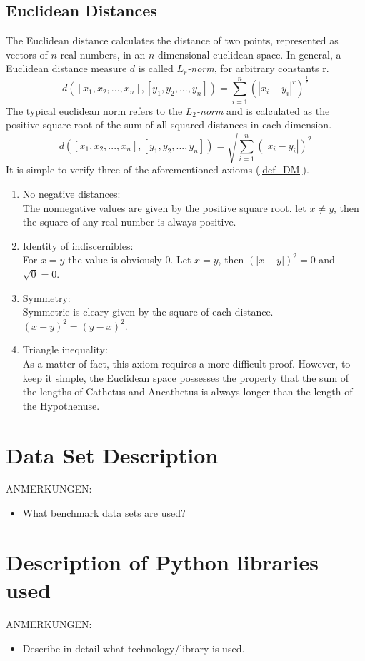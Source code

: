 \documentclass[12pt]%
{article}
\begin{document}
\subsection{Euclidean Distances}
The Euclidean distance calculates the distance of two points, represented as vectors of $n$ real numbers, in an $n$-dimensional euclidean space. In general, a Euclidean distance measure $d$ is called $L_r$\textit{-norm}, for arbitrary constants r. 
$$d([x_1,x_2,...,x_n], [y_1,y_2,...,y_n])=\sum_{i=1}^{n}(|x_i-y_i|^r)^\frac{1}{r}$$
The typical euclidean norm refers to the $L_2$\textit{-norm} and is calculated as the positive square root of the sum of all squared distances in each dimension.
$$d([x_1,x_2,...,x_n], [y_1,y_2,...,y_n])=\sqrt{\sum_{i=1}^{n}(|x_i-y_i|)^2}$$
It is simple to verify three of the aforementioned axioms (\ref{def_DM}).
\begin{enumerate}
\item No negative distances:\\
The nonnegative values are given by the positive square root. let $x \neq y$, then the square of any real number is always positive.
\item Identity of indiscernibles:\\
For $x = y$ the value is obviously $0$. Let $x = y$, then $(|x - y|)^2 = 0$ and $\sqrt{0} = 0$.
\item Symmetry: \\
Symmetrie is cleary given by the square of each distance.\\
$(x - y)^2 = (y - x)^2$.
\item Triangle inequality: \\
As a matter of fact, this axiom requires a more difficult proof. However, to keep it simple, the Euclidean space possesses the property that the sum of the lengths of Cathetus and Ancathetus is always longer than the length of the Hypothenuse. \cite{MMDS}
\end{enumerate}

\section{Data Set Description}
ANMERKUNGEN:
\begin{itemize}
\item What benchmark data sets are used?
\end{itemize}

\section{Description of Python libraries used}
ANMERKUNGEN:
\begin{itemize}
\item Describe in detail what technology/library is used.
\end{itemize}
\end{document}
